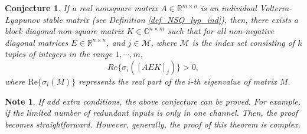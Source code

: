 \documentclass{article}
\newtheorem{note}{Note}
\newtheorem{conjecture}{Conjecture}
\begin{document}
\begin{conjecture}
If a real nonsquare matrix $A \in \mathbb{R}^{m \times n}$ is an individual Volterra-Lyapunov stable matrix (see Definition \ref{def_NSQ_lyp_ind}),
then, there exists a 
 block diagonal non-square matrix $K \in \mathbb{C}^{n \times m}$ such that for all non-negative diagonal matrices $E \in  \mathbb{R}^{n \times n}$, and $j \in \mathcal{M}$, where $\mathcal{M}$ is the index set consisting of $k$ tuples of integers in the
range $1,\cdots, m$,
\begin{equation}\label{suf_con}
Re\{ \sigma_i ( [A E K]_j ) \} >0,
\end{equation}
where $\text{Re} \{ \sigma_i (M) \}$ represents the real part of the $i$-th eigenvalue of matrix $M$.
\end{conjecture}

\begin{note}
If add extra conditions, the above conjecture can be proved. For example, if the limited number of redundant inputs is only in one channel. Then, the proof becomes straightforward. However, generally, the proof of this theorem is complex.  
\end{note}
\end{document}
